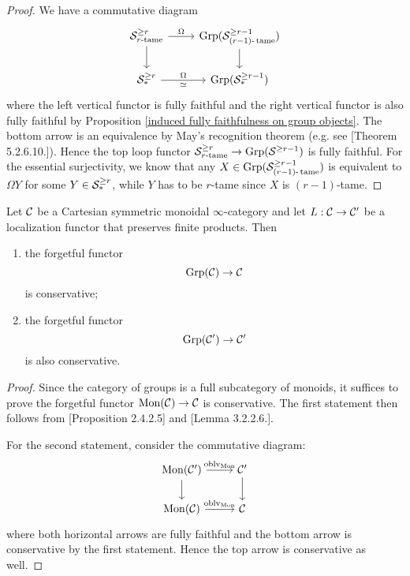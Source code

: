 \begin{proof}
	We have a commutative diagram 
	\[
	\begin{tikzcd}
		\CS^{\geq r}_{\text{$r$-tame}} & \Grp(\CS^{\geq r-1}_{(r-1)\text{-}\tame})\\
		\CS^{\geq r}_*   &  \Grp(\CS^{\geq r-1}_{*})  	
	\arrow[from=1-1, to=1-2,"\Omega"]
	\arrow[from=2-1, to=2-2, "\Omega","\simeq" below]
	\arrow[from=1-1, to=2-1]
	\arrow[from=1-2, to=2-2]
	\end{tikzcd}
	\]
	where the left vertical functor is fully faithful and the right vertical functor is also fully faithful by Proposition \ref{induced fully faithfulness on group objects}. The bottom arrow is an equivalence by May's recognition theorem (e.g. see \cite{HA}[Theorem 5.2.6.10.]). Hence the top loop functor ${\mathcal{S}}^{\geq r}_{\text{$r$-tame}} \to \operatorname{Grp}({\mathcal{S}}^{\geq r-1})$ is fully faithful.
	For the essential surjectivity, we know that any $X\in \operatorname{Grp}({\mathcal{S}}^{\geq r-1}_{(r-1)\text{-}\operatorname{\operatorname{tame}}})$ is equivalent to $\Omega Y$ for some $Y\in {\mathcal{S}}^{\geq r}_*$, while $Y$ has to be $r$-tame since $X$ is $(r-1)$-tame.
	
\end{proof}

\begin{lemma}
\label{conservativity of forgetful functor (general)}
	Let ${\mathcal{C}}$ be a Cartesian symmetric monoidal $\infty$-category and let $L:{\mathcal{C}}\to {\mathcal{C}}'$ be a localization functor that preserves finite products.
	Then 
	\begin{enumerate}
		\item the forgetful functor
	\[
	\operatorname{Grp}({\mathcal{C}})\to {\mathcal{C}}
	\]
	is conservative;
	\item the forgetful functor
	\[
	\operatorname{Grp}({\mathcal{C}}')\to {\mathcal{C}}'
	\]
	is also conservative.
	\end{enumerate}
\end{lemma}
\begin{proof}
	Since the category of groups is a full subcategory of monoids, it suffices to prove the forgetful functor $\operatorname{Mon}({\mathcal{C}})\to {\mathcal{C}}$ is conservative.
	The first statement then follows from \cite{HA}[Proposition 2.4.2.5] and \cite{HA}[Lemma 3.2.2.6.].
	
	For the second statement, consider the commutative diagram:
	\[
\begin{tikzcd}
	\Mon(\CC') & \CC'\\
	\Mon(\CC) & 
	\CC	
	\arrow[from=1-1, to= 1-2, "\oblv_{\Mon}"]
	\arrow[from=1-1, to=2-1]
	\arrow[from=1-2, to=2-2]
	\arrow[from=2-1, to= 2-2, "\oblv_{\Mon}"]
\end{tikzcd}
\]
where both horizontal arrows are fully faithful and the bottom arrow is conservative by the first statement. Hence the top arrow is conservative as well.
\end{proof}

